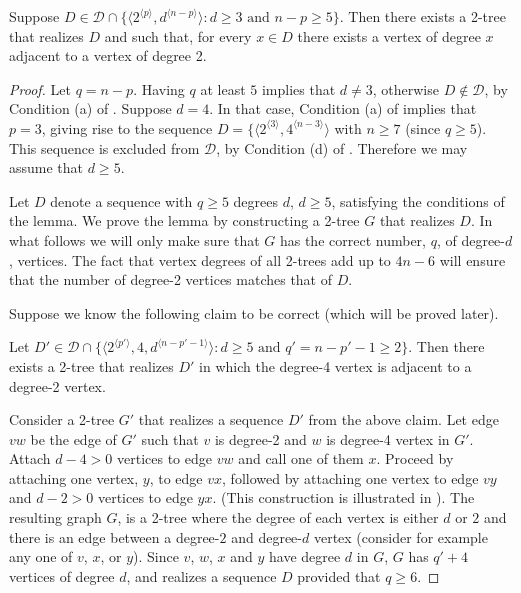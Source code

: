 \documentclass[lotsofwhite,charterfonts]{patmorin}
\newcommand{\rep}[1]{^{\langle#1\rangle}}
\begin{document}
\begin{lem}
Suppose $D\in \mathcal{D}\cap \{\langle 2\rep{p},d\rep{n-p}\rangle:
\mbox{$d\ge 3$ and $n-p \ge 5$}\}$.
Then there exists a 2-tree that realizes $D$ and such that, for every
$x\in D$ there exists a vertex
of degree $x$ adjacent to a vertex of degree 2.
\end{lem}

\begin{proof}
Let $q=n-p$. Having $q$ at least $5$ implies that $d\not=3$, otherwise
$D\not\in \mathcal{D}$, by Condition (a) of . Suppose
$d=4$. In that case, Condition (a) of  implies that
$p=3$, giving rise to the sequence $D=\{\langle
2\rep{3},4\rep{n-3}\rangle$ with $n\geq 7$ (since $q\geq 5$). This
sequence is excluded from $\mathcal{D}$, by Condition (d) of
. Therefore we may assume that $d\geq 5$.

Let $D$ denote a sequence with $q\geq 5$ degrees $d$, $d\geq 5$,
satisfying the conditions of the lemma. We prove the lemma by
constructing a 2-tree $G$ that realizes $D$. In what follows we will
only make sure that $G$ has the correct number, $q$, of degree-$d$,
vertices. The fact that vertex degrees of all 2-trees add up to $4n-6$
will ensure that the number of degree-2 vertices matches that of $D$.

Suppose we know the following claim to be correct (which will be proved later).

\begin{clm} Let $D'\in \mathcal{D}\cap \{\langle 2\rep{p'},4, d\rep{n-p'-1}\rangle:\mbox{$d\ge 5$ and $q'=n-p'-1 \ge 2$}\}$.
Then there exists a 2-tree that realizes $D'$ in which the degree-4 vertex is adjacent to a degree-2 vertex.
\end{clm}

Consider a 2-tree $G'$ that realizes a sequence $D'$ from the above
claim. Let edge $vw$ be the edge of $G'$ such that $v$ is degree-2 and
$w$ is degree-4 vertex in $G'$. Attach $d-4>0$ vertices to edge $vw$
and call one of them $x$. Proceed by attaching one vertex, $y$, to
edge $vx$, followed by attaching one vertex to edge $vy$ and $d-2>0$
vertices to edge $yx$. (This construction is illustrated in
). The resulting graph $G$, is a 2-tree where the degree of
each vertex is either $d$ or $2$ and there is an edge between a
degree-$2$ and degree-$d$ vertex  (consider for example any one of
$v$, $x$, or $y$). Since $v$, $w$, $x$ and $y$ have degree $d$ in $G$,
$G$ has $q'+4$ vertices of degree $d$, and realizes a sequence $D$
provided that $q\geq 6$.


\end{proof}
\end{document}

